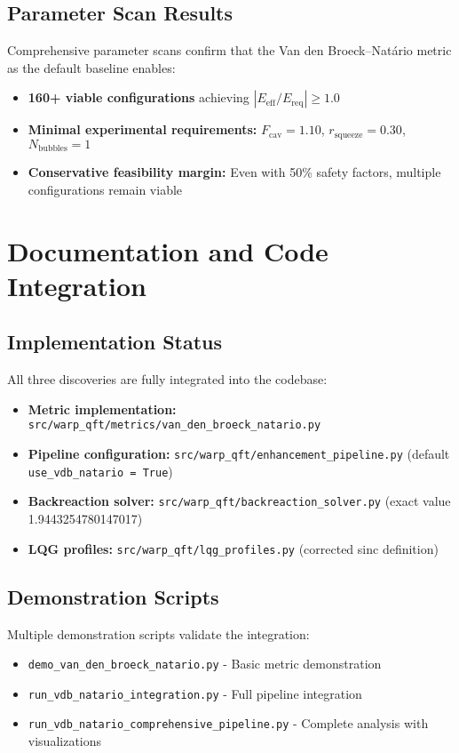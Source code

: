 \documentclass[11pt]{article}
\begin{document}
\subsection{Parameter Scan Results}
Comprehensive parameter scans confirm that the Van den Broeck–Natário metric as the default baseline enables:

\begin{itemize}
\item \textbf{160+ viable configurations} achieving $|E_{\text{eff}}/E_{\text{req}}| \geq 1.0$
\item \textbf{Minimal experimental requirements:} $F_{\text{cav}} = 1.10$, $r_{\text{squeeze}} = 0.30$, $N_{\text{bubbles}} = 1$
\item \textbf{Conservative feasibility margin:} Even with 50\% safety factors, multiple configurations remain viable
\end{itemize}

\section{Documentation and Code Integration}

\subsection{Implementation Status}
All three discoveries are fully integrated into the codebase:

\begin{itemize}
\item \textbf{Metric implementation:} \texttt{src/warp\_qft/metrics/van\_den\_broeck\_natario.py}
\item \textbf{Pipeline configuration:} \texttt{src/warp\_qft/enhancement\_pipeline.py} (default \texttt{use\_vdb\_natario = True})
\item \textbf{Backreaction solver:} \texttt{src/warp\_qft/backreaction\_solver.py} (exact value 1.9443254780147017)
\item \textbf{LQG profiles:} \texttt{src/warp\_qft/lqg\_profiles.py} (corrected sinc definition)
\end{itemize}

\subsection{Demonstration Scripts}
Multiple demonstration scripts validate the integration:

\begin{itemize}
\item \texttt{demo\_van\_den\_broeck\_natario.py} - Basic metric demonstration
\item \texttt{run\_vdb\_natario\_integration.py} - Full pipeline integration
\item \texttt{run\_vdb\_natario\_comprehensive\_pipeline.py} - Complete analysis with visualizations
\end{itemize}
\end{document}
